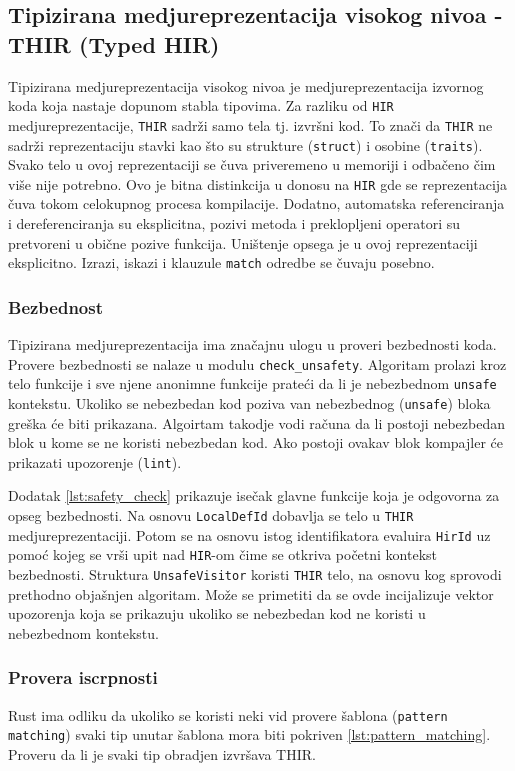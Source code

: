 \subsection{Tipizirana medjureprezentacija visokog nivoa - THIR (Typed HIR)}

Tipizirana medjureprezentacija visokog nivoa je medjureprezentacija izvornog koda koja nastaje dopunom stabla tipovima.
Za razliku od \verb|HIR| medjureprezentacije, \verb|THIR| sadrži samo tela tj. izvršni kod. To znači da \verb|THIR| 
ne sadrži reprezentaciju stavki kao što su strukture (\verb|struct|) i osobine (\verb|traits|). Svako telo u ovoj reprezentaciji
se čuva priveremeno u memoriji i odbačeno čim više nije potrebno. Ovo je bitna distinkcija u donosu na \verb|HIR| gde se reprezentacija 
čuva tokom celokupnog procesa kompilacije. Dodatno, automatska referenciranja i dereferenciranja su eksplicitna, pozivi metoda i 
preklopljeni operatori su pretvoreni u obične pozive funkcija. Uništenje opsega je u ovoj reprezentaciji eksplicitno.
Izrazi, iskazi i klauzule \verb|match| odredbe se čuvaju posebno.

\subsubsection{Bezbednost}

Tipizirana medjureprezentacija ima značajnu ulogu u proveri bezbednosti koda. Provere bezbednosti se nalaze u modulu \verb|check_unsafety|.
Algoritam prolazi kroz telo funkcije i sve njene anonimne funkcije prateći da li je nebezbednom \verb|unsafe| kontekstu.
Ukoliko se nebezbedan kod poziva van nebezbednog (\verb|unsafe|) bloka greška će biti prikazana. Algoirtam takodje vodi računa da li 
postoji nebezbedan blok u kome se ne koristi nebezbedan kod. Ako postoji ovakav blok kompajler će prikazati upozorenje (\verb|lint|).

Dodatak \ref{lst:safety_check} prikazuje isečak glavne funkcije koja je odgovorna za opseg bezbednosti. 
Na osnovu \verb|LocalDefId| dobavlja se telo u \verb|THIR| medjureprezentaciji. Potom se na osnovu istog 
identifikatora evaluira \verb|HirId| uz pomoć kojeg se vrši upit nad \verb|HIR|-om čime se otkriva početni kontekst bezbednosti.
Struktura \verb|UnsafeVisitor| koristi \verb|THIR| telo, na osnovu kog sprovodi prethodno objašnjen algoritam. Može se primetiti 
da se ovde incijalizuje vektor upozorenja koja se prikazuju ukoliko se nebezbedan kod ne koristi u nebezbednom kontekstu.

\subsubsection{Provera iscrpnosti}
Rust ima odliku da ukoliko se koristi neki vid provere šablona (\verb|pattern matching|) svaki tip unutar 
šablona mora biti pokriven \ref{lst:pattern_matching}. Proveru da li je svaki tip obradjen izvršava THIR. 

